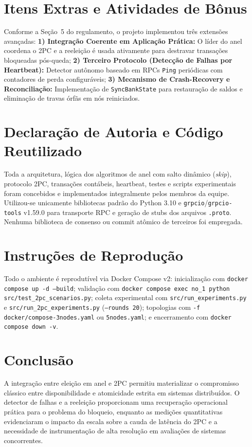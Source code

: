 \documentclass[conference]{IEEEtran}
\begin{document}
\section{Itens Extras e Atividades de Bônus}
Conforme a Seção~5 do regulamento, o projeto implementou três extensões avançadas:
\textbf{1) Integração Coerente em Aplicação Prática:} O líder do anel coordena o 2PC e a reeleição é usada ativamente para destravar transações bloqueadas pós-queda;
\textbf{2) Terceiro Protocolo (Detecção de Falhas por Heartbeat):} Detector autônomo baseado em RPCs \texttt{Ping} periódicas com contadores de perda configuráveis;
\textbf{3) Mecanismo de Crash-Recovery e Reconciliação:} Implementação de \texttt{SyncBankState} para restauração de saldos e eliminação de travas órfãs em nós reiniciados.

\section{Declaração de Autoria e Código Reutilizado}
Toda a arquitetura, lógica dos algoritmos de anel com salto dinâmico (\textit{skip}), protocolo 2PC, transações contábeis, heartbeat, testes e scripts experimentais foram concebidos e implementados integralmente pelos membros da equipe. Utilizou-se unicamente bibliotecas padrão do Python 3.10 e \texttt{grpcio}/\texttt{grpcio-tools} v1.59.0 para transporte RPC e geração de stubs dos arquivos \texttt{.proto}. Nenhuma biblioteca de consenso ou commit atômico de terceiros foi empregada.

\section{Instruções de Reprodução}
Todo o ambiente é reprodutível via Docker Compose v2: inicialização com \texttt{docker compose up -d --build}; validação com \texttt{docker compose exec no\_1 python src/test\_2pc\_scenarios.py}; coleta experimental com \texttt{src/run\_experiments.py} e \texttt{src/run\_2pc\_experiments.py} (\texttt{--rounds 20}); topologias com \texttt{-f docker/compose-3nodes.yaml} ou \texttt{5nodes.yaml}; e encerramento com \texttt{docker compose down -v}.

\section{Conclusão}
A integração entre eleição em anel e 2PC permitiu materializar o compromisso clássico entre disponibilidade e atomicidade estrita em sistemas distribuídos. O detector de falhas e a reeleição proporcionam uma recuperação operacional prática para o problema do bloqueio, enquanto as medições quantitativas evidenciaram o impacto da escala sobre a cauda de latência do 2PC e a necessidade de instrumentação de alta resolução em avaliações de sistemas concorrentes.
\end{document}
